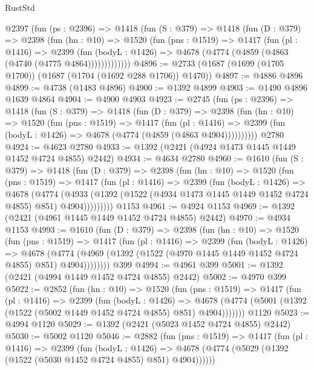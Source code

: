 \begin{lexlean}{RustStd}
\begin{coremodule}
    @2397
      (fun (ps : @2396) =>
      @1418
        (fun (S : @379) =>
        @1418
          (fun (D : @379) =>
          @2398
            (fun (hn : @10) =>
            @1520
              (fun (pns : @1519) =>
              @1417
                (fun (pl : @1416) =>
                @2399
                  (fun (bodyL : @1426) =>
                  @4678 (@4774 (@4859 (@4863 (@4740 (@4775 @4864)))))))))))))
@4896 := @2733 (@1687 (@1699 (@1705 @1700)) (@1687 (@1704 (@1692 @288 @1706)) @1470))
@4897 := @4886 @4896
@4899 := @4738 (@1483 @4896)
@4900 := @1392 @4899
@4903 := @1490 @4896 @1639 @4864
@4904 := @4900 @4903
@4923 := @2745
    (fun (ps : @2396) =>
    @1418
      (fun (S : @379) =>
      @1418
        (fun (D : @379) =>
        @2398
          (fun (hn : @10) =>
          @1520
            (fun (pns : @1519) =>
            @1417
              (fun (pl : @1416) =>
              @2399 (fun (bodyL : @1426) => @4678 (@4774 (@4859 (@4863 @4904))))))))))
    @2780
@4924 := @4623 @2780
@4933 := @1392 (@2421 (@4924 @1473 @1445 @1449 @1452 @4724 @4855) @2442)
@4934 := @4634 @2780
@4960 := @1610
    (fun (S : @379) =>
    @1418
      (fun (D : @379) =>
      @2398
        (fun (hn : @10) =>
        @1520
          (fun (pns : @1519) =>
          @1417
            (fun (pl : @1416) =>
            @2399
              (fun (bodyL : @1426) =>
              @4678
                (@4774
                  (@4933
                    (@1392 (@1522 (@4934 @1473 @1445 @1449 @1452 @4724 @4855) @851) @4904)))))))))
    @1153
@4961 := @4924 @1153
@4969 := @1392 (@2421 (@4961 @1445 @1449 @1452 @4724 @4855) @2442)
@4970 := @4934 @1153
@4993 := @1610
    (fun (D : @379) =>
    @2398
      (fun (hn : @10) =>
      @1520
        (fun (pns : @1519) =>
        @1417
          (fun (pl : @1416) =>
          @2399
            (fun (bodyL : @1426) =>
            @4678
              (@4774 (@4969 (@1392 (@1522 (@4970 @1445 @1449 @1452 @4724 @4855) @851) @4904))))))))
    @399
@4994 := @4961 @399
@5001 := @1392 (@2421 (@4994 @1449 @1452 @4724 @4855) @2442)
@5002 := @4970 @399
@5022 := @2852
    (fun (hn : @10) =>
    @1520
      (fun (pns : @1519) =>
      @1417
        (fun (pl : @1416) =>
        @2399
          (fun (bodyL : @1426) =>
          @4678 (@4774 (@5001 (@1392 (@1522 (@5002 @1449 @1452 @4724 @4855) @851) @4904)))))))
    @1120
@5023 := @4994 @1120
@5029 := @1392 (@2421 (@5023 @1452 @4724 @4855) @2442)
@5030 := @5002 @1120
@5046 := @2882
    (fun (pns : @1519) =>
    @1417
      (fun (pl : @1416) =>
      @2399
        (fun (bodyL : @1426) =>
        @4678 (@4774 (@5029 (@1392 (@1522 (@5030 @1452 @4724 @4855) @851) @4904))))))

\end{coremodule}
\end{lexlean}
